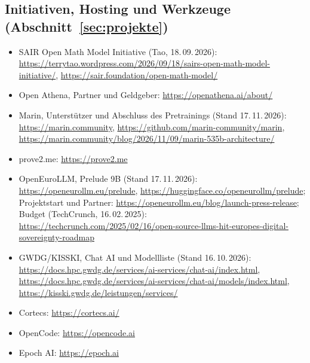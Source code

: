 \documentclass[a4paper,11pt]{article}
\begin{document}
{\subsection*{Initiativen, Hosting und Werkzeuge (Abschnitt~\ref{sec:projekte})}
\begin{itemize}[itemsep=0.1em]
  \item SAIR Open Math Model Initiative (Tao, 18.\,09.\,2026):
    \url{https://terrytao.wordpress.com/2026/09/18/sairs-open-math-model-initiative/},
    \url{https://sair.foundation/open-math-model/}
  \item Open Athena, Partner und Geldgeber:
    \url{https://openathena.ai/about/}
  \item Marin, Unterstützer und Abschluss des Pretrainings (Stand
    17.\,11.\,2026):
    \url{https://marin.community},
    \url{https://github.com/marin-community/marin},
    \url{https://marin.community/blog/2026/11/09/marin-535b-architecture/}
  \item prove2.me: \url{https://prove2.me}
  \item OpenEuroLLM, Prelude 9B (Stand 17.\,11.\,2026):
    \url{https://openeurollm.eu/prelude},
    \url{https://huggingface.co/openeurollm/prelude}; Projektstart und
    Partner: \url{https://openeurollm.eu/blog/launch-press-release};
    Budget (TechCrunch, 16.\,02.\,2025):
    \url{https://techcrunch.com/2025/02/16/open-source-llms-hit-europes-digital-sovereignty-roadmap}
  \item GWDG/KISSKI, Chat AI und Modellliste (Stand 16.\,10.\,2026):\newline
    \url{https://docs.hpc.gwdg.de/services/ai-services/chat-ai/index.html},
    \url{https://docs.hpc.gwdg.de/services/ai-services/chat-ai/models/index.html},
    \url{https://kisski.gwdg.de/leistungen/services/}
  \item Cortecs: \url{https://cortecs.ai/}
  \item OpenCode: \url{https://opencode.ai}
  \item Epoch AI: \url{https://epoch.ai}
\end{itemize}
}
\end{document}
